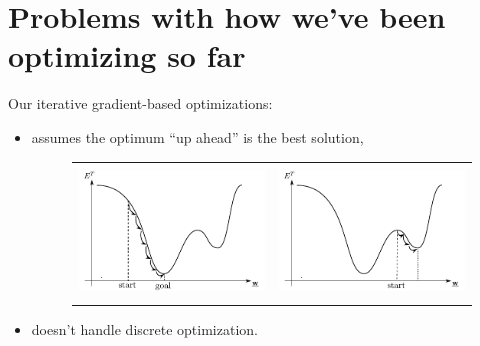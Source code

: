 \section{Problems with how we've been optimizing so far}

\begin{frame}

Our iterative gradient-based optimizations:
\begin{itemize}
\item assumes the optimum ``up ahead'' is the best solution,

\begin{figure}[ht]
  \centering
  \begin{tabular}{c c}
      \includegraphics[height=3.5cm]{img/gradient-descent.pdf} &
      \includegraphics[height=3.5cm]{img/gradient-descent_local.pdf}
  \end{tabular}
\end{figure}

\item doesn't handle discrete optimization.
\end{itemize}

\end{frame}
